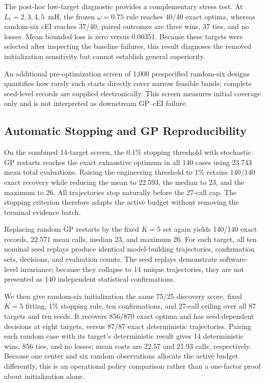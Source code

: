 \documentclass[conference]{IEEEtran}
\begin{document}
The post-hoc low-target diagnostic provides a complementary stress test. At $L_t=2,3,4,5$~mH, the frozen $\omega=0.75$ rule reaches 40/40 exact optima, whereas random-six cEI reaches 37/40; paired outcomes are three wins, 37 ties, and no losses. Mean bounded loss is zero versus 0.00351. Because these targets were selected after inspecting the baseline failures, this result diagnoses the removed initialization sensitivity but cannot establish general superiority.

An additional pre-optimization screen of 1,000 prespecified random-six designs quantifies how rarely such starts directly cover narrow feasible bands; complete seed-level records are supplied electronically. This screen measures initial coverage only and is not interpreted as downstream GP--cEI failure.

\subsection{Automatic Stopping and GP Reproducibility}
On the combined 14-target screen, the 0.1\% stopping threshold with stochastic GP restarts reaches the exact exhaustive optimum in all 140 cases using 23.743 mean total evaluations. Raising the engineering threshold to 1\% retains 140/140 exact recovery while reducing the mean to 22.593, the median to 23, and the maximum to 26. All trajectories stop naturally before the 27-call cap. The stopping criterion therefore adapts the active budget without removing the terminal evidence batch.

Replacing random GP restarts by the fixed $K=5$ set again yields 140/140 exact records, 22.571 mean calls, median 23, and maximum 26. For each target, all ten nominal seed replays produce identical model-building trajectories, confirmation sets, decisions, and evaluation counts. The seed replays demonstrate software-level invariance; because they collapse to 14 unique trajectories, they are not presented as 140 independent statistical confirmations.

We then give random-six initialization the same 75/25 discovery score, fixed $K=5$ fitting, 1\% stopping rule, ten confirmations, and 27-call ceiling over all 87 targets and ten seeds. It recovers 856/870 exact optima and has seed-dependent decisions at eight targets, versus 87/87 exact deterministic trajectories. Pairing each random case with its target's deterministic result gives 14 deterministic wins, 856 ties, and no losses; mean costs are 22.57 and 21.93 calls, respectively. Because one center and six random observations allocate the active budget differently, this is an operational policy comparison rather than a one-factor proof about initialization alone.
\end{document}
